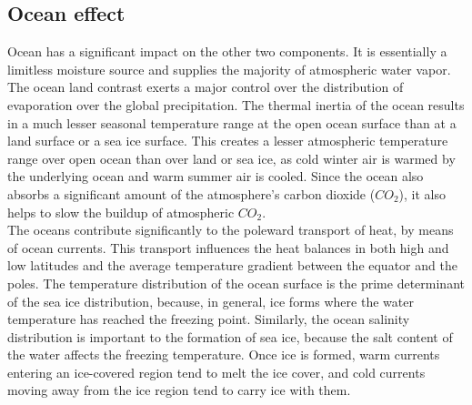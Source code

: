 \subsection{Ocean effect}
Ocean has a significant impact on the other two components. It is essentially a limitless moisture source and supplies the majority of atmospheric water vapor. The ocean land contrast exerts a major control over the distribution of evaporation over the global precipitation. The thermal inertia of the ocean results in a much lesser seasonal temperature range at the open ocean surface than at a land surface or a sea ice surface. 
This creates a lesser atmospheric temperature range over open ocean than over land or sea ice, as cold winter air is warmed by the underlying ocean and warm summer air is cooled. %
Since the ocean also absorbs a significant amount of the atmosphere’s carbon dioxide ($CO_2$), it also helps to slow the buildup of atmospheric $CO_2$. \\
[0.1 cm]
The oceans contribute significantly to the poleward transport of heat, by means of ocean currents. This transport influences the heat balances in both high and low latitudes and the average temperature gradient between the equator and the poles. The temperature distribution of the ocean surface is the prime determinant of the sea ice distribution, because, in general, ice forms where the water temperature has reached the freezing point. Similarly, the ocean salinity distribution is important to the formation of sea ice, because the salt content of the water affects the freezing temperature. Once ice is formed, warm currents entering an ice-covered region tend to melt the ice cover, and cold currents moving away from the ice region tend to carry ice with them. 


